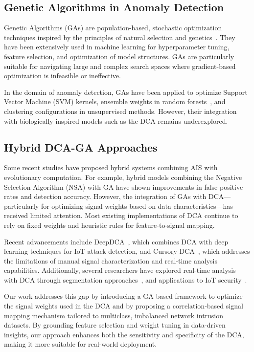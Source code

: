 \documentclass[conference]{IEEEtran}
\begin{document}
\subsection{Genetic Algorithms in Anomaly Detection}

Genetic Algorithms (GAs) are population-based, stochastic
optimization techniques inspired by the principles of natural
selection and genetics~\cite{freund_decision-theoretic_1997}. They
have been extensively used in machine
learning for hyperparameter tuning, feature selection, and
optimization of model structures. GAs are particularly suitable for
navigating large and complex search spaces where gradient-based
optimization is infeasible or ineffective.

In the domain of anomaly detection, GAs have been applied to optimize
Support Vector Machine (SVM) kernels, ensemble weights in random
forests~\cite{breiman_random_2001}, and clustering configurations in
unsupervised methods.
However, their integration with biologically inspired models such as
the DCA remains underexplored.

\subsection{Hybrid DCA-GA Approaches}

Some recent studies have proposed hybrid systems combining AIS with
evolutionary computation. For example, hybrid models combining the
Negative Selection Algorithm (NSA) with GA have shown improvements in
false positive rates and detection accuracy. However, the integration
of GAs with DCA—particularly for optimizing signal weights based on
data characteristics—has received limited attention. Most existing
implementations of DCA continue to rely on fixed weights and
heuristic rules for feature-to-signal mapping.

Recent advancements include DeepDCA~\cite{aldhaheri_deepdca_2020}, which combines DCA with deep learning techniques
for IoT attack detection, and Cursory DCA~\cite{pinto_towards_2022}, which addresses the limitations of
manual signal characterization and real-time analysis capabilities. Additionally, several
researchers have explored real-time analysis with DCA through segmentation approaches~\cite{gu_integrating_2009},
and applications to IoT security~\cite{elisa_anomaly_2021}.

Our work addresses this gap by introducing a GA-based framework to
optimize the signal weights used in the DCA and by proposing a
correlation-based signal mapping mechanism tailored to multiclass,
imbalanced network intrusion datasets. By grounding feature selection
and weight tuning in data-driven insights, our approach enhances both
the sensitivity and specificity of the DCA, making it more suitable
for real-world deployment.
\end{document}
